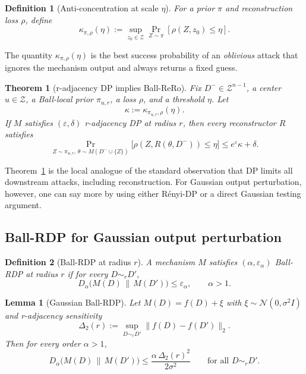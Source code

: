 \documentclass[conference,compsoc]{IEEEtran}
\newtheorem{definition}{Definition}
\newtheorem{theorem}{Theorem}
\newtheorem{lemma}{Lemma}
\begin{document}
\begin{definition}[Anti-concentration at scale $\eta$]
\label{def:kappa}
For a prior $\pi$ and reconstruction loss $\rho$, define
\[
\kappa_{\pi,\rho}(\eta)
:=
\sup_{z_0\in\mathcal{Z}}
\Pr_{Z\sim\pi}[\rho(Z,z_0)\le \eta].
\]
\end{definition}

The quantity $\kappa_{\pi,\rho}(\eta)$ is the best success probability of an \emph{oblivious} attack that ignores the mechanism output and always returns a fixed guess.

\begin{theorem}[r-adjacency DP implies Ball-ReRo]
\label{thm:ball-dp-rero}
Fix $D^-\in\mathcal{Z}^{n-1}$, a center $u\in\mathcal{Z}$, a Ball-local prior $\pi_{u,r}$, a loss $\rho$, and a threshold $\eta$. Let
\[
\kappa:=\kappa_{\pi_{u,r},\rho}(\eta).
\]
If $M$ satisfies $(\varepsilon,\delta)$ r-adjacency DP at radius $r$, then every reconstructor $R$ satisfies
\[
\Pr_{Z\sim\pi_{u,r},\,\theta\sim M(D^-\cup\{Z\})}
\big[\rho(Z,R(\theta,D^-))\le \eta\big]
\le e^{\varepsilon}\kappa+\delta.
\]
\end{theorem}

Theorem~\ref{thm:ball-dp-rero} is the local analogue of the standard observation that DP limits all downstream attacks, including reconstruction. For Gaussian output perturbation, however, one can say more by using either Rényi-DP or a direct Gaussian testing argument.

\subsection{Ball-RDP for Gaussian output perturbation}

\begin{definition}[Ball-RDP at radius $r$]
A mechanism $M$ satisfies \emph{$(\alpha,\varepsilon_\alpha)$ Ball-RDP at radius $r$} if for every $D\sim_r D'$,
\[
D_\alpha\big(M(D)\,\|\,M(D')\big)\le \varepsilon_\alpha,
\qquad \alpha>1.
\]
\end{definition}

\begin{lemma}[Gaussian Ball-RDP]
\label{lem:gaussian-ball-rdp}
Let $M(D)=f(D)+\xi$ with $\xi\sim\mathcal{N}(0,\sigma^2 I)$ and r-adjacency sensitivity
\[
\Delta_2(r):=\sup_{D\sim_r D'}\|f(D)-f(D')\|_2.
\]
Then for every order $\alpha>1$,
\[
D_\alpha\big(M(D)\,\|\,M(D')\big)
\le
\frac{\alpha\,\Delta_2(r)^2}{2\sigma^2}
\qquad \text{for all }D\sim_r D'.
\]
\end{lemma}
\end{document}

